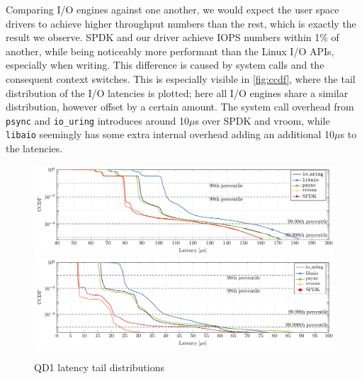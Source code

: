 Comparing I/O engines against one another, we would expect the user space drivers to achieve higher throughput numbers than the rest, which is exactly the result we observe. SPDK and our driver achieve IOPS numbers within 1\% of another, while being noticeably more performant than the Linux I/O APIs, especially when writing. This difference is caused by system calls and the consequent context switches. This is especially visible in \autoref{fig:ccdf}, where the tail distribution of the I/O latencies is plotted; here all I/O engines share a similar distribution, however offset by a certain amount. The system call overhead from \texttt{psync} and \texttt{io\_uring} introduces around 10$\mu$s over SPDK and vroom, while \texttt{libaio} seemingly has some extra internal overhead adding an additional 10$\mu$s to the latencies.

\begin{figure}
  \centering
   {\includegraphics[width=\textwidth]{figures/latency-ccdf-read} \label{fig:ccdf-read}}
   {\includegraphics[width=\textwidth]{figures/latency-ccdf-write} \label{fig:ccdf-write}}
  \caption{QD1 latency tail distributions}
  \label{fig:ccdf}
\end{figure}

